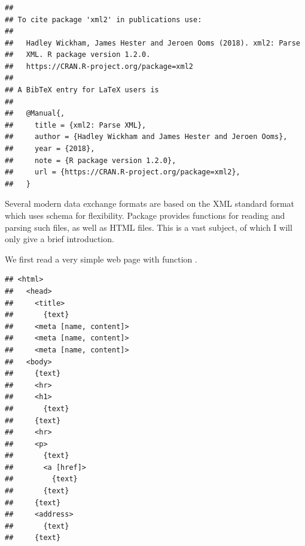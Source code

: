 \documentclass[krantz2]{krantz}\usepackage{knitr}%
\begin{document}
\subsubsection['xml2']{}

\begin{knitrout}\footnotesize
{}\color{fgcolor}\begin{kframe}
\begin{alltt}
\hlstd{(} \hlstd{=} \hlstd{)}
\end{alltt}
\begin{verbatim}
## 
## To cite package 'xml2' in publications use:
## 
##   Hadley Wickham, James Hester and Jeroen Ooms (2018). xml2: Parse
##   XML. R package version 1.2.0.
##   https://CRAN.R-project.org/package=xml2
## 
## A BibTeX entry for LaTeX users is
## 
##   @Manual{,
##     title = {xml2: Parse XML},
##     author = {Hadley Wickham and James Hester and Jeroen Ooms},
##     year = {2018},
##     note = {R package version 1.2.0},
##     url = {https://CRAN.R-project.org/package=xml2},
##   }
\end{verbatim}
\end{kframe}
\end{knitrout}

Several modern data exchange formats are based on the XML standard format which uses schema for flexibility. Package  provides functions for reading and parsing such files, as well as HTML files. This is a vast subject, of which I will only give a brief introduction.

We first read a very simple web page with function .

\begin{knitrout}\footnotesize
{}\color{fgcolor}\begin{kframe}
\begin{alltt}
 \hlkwb{<-} \hlstd{(}\hlstd{)}
\end{alltt}
\begin{verbatim}
## <html>
##   <head>
##     <title>
##       {text}
##     <meta [name, content]>
##     <meta [name, content]>
##     <meta [name, content]>
##   <body>
##     {text}
##     <hr>
##     <h1>
##       {text}
##     {text}
##     <hr>
##     <p>
##       {text}
##       <a [href]>
##         {text}
##       {text}
##     {text}
##     <address>
##       {text}
##     {text}
\end{verbatim}
\end{kframe}
\end{knitrout}
\end{document}
